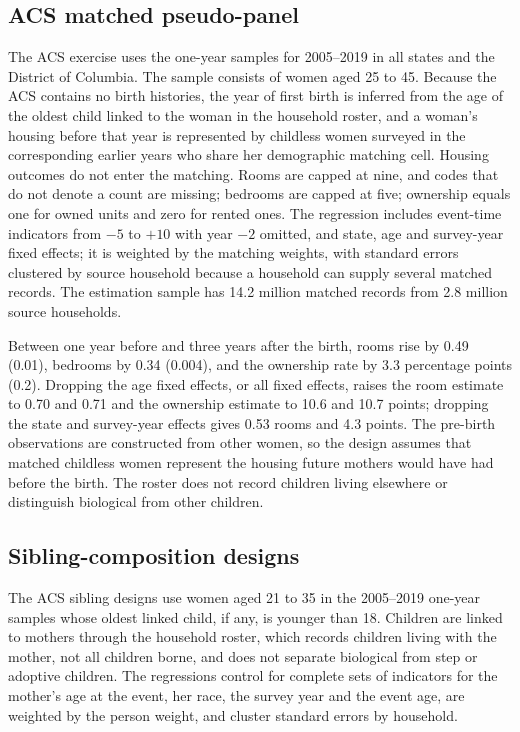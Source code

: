 \subsection{ACS matched pseudo-panel}

The ACS exercise uses the one-year samples for 2005--2019 in all states and
the District of Columbia. The sample consists of women aged 25 to 45. Because
the ACS contains no birth histories, the year of first birth is inferred from
the age of the oldest child linked to the woman in the household roster, and a
woman's housing before that year is represented by childless women surveyed in
the corresponding earlier years who share her demographic matching cell.
Housing outcomes do not enter the matching. Rooms are capped at nine, and codes
that do not denote a count are missing; bedrooms are capped at five; ownership
equals one for owned units and zero for rented ones. The regression includes
event-time indicators from $-5$ to $+10$ with year $-2$ omitted, and state, age
and survey-year fixed effects; it is weighted by the matching weights, with
standard errors clustered by source household because a household can supply
several matched records. The estimation sample has 14.2 million matched
records from 2.8 million source households.

Between one year before and three years after the birth, rooms rise by 0.49
(0.01), bedrooms by 0.34 (0.004), and the ownership rate by 3.3 percentage
points (0.2). Dropping the age fixed effects, or all fixed effects, raises the
room estimate to 0.70 and 0.71 and the ownership estimate to 10.6 and 10.7
points; dropping the state and survey-year effects gives 0.53 rooms and 4.3
points. The pre-birth observations are constructed from other
women, so the design assumes that matched childless women represent the
housing future mothers would have had before the birth. The roster does not
record children living elsewhere or distinguish biological from other
children.

\subsection{Sibling-composition designs}

The ACS sibling designs use women aged 21 to 35 in the 2005--2019 one-year
samples whose oldest linked child, if any, is younger than 18. Children are
linked to mothers through the household roster, which records children living
with the mother, not all children borne, and does not separate biological from
step or adoptive children. The regressions control for complete sets of
indicators for the mother's age at the event, her race, the survey year and
the event age, are weighted by the person weight, and cluster standard errors
by household.

